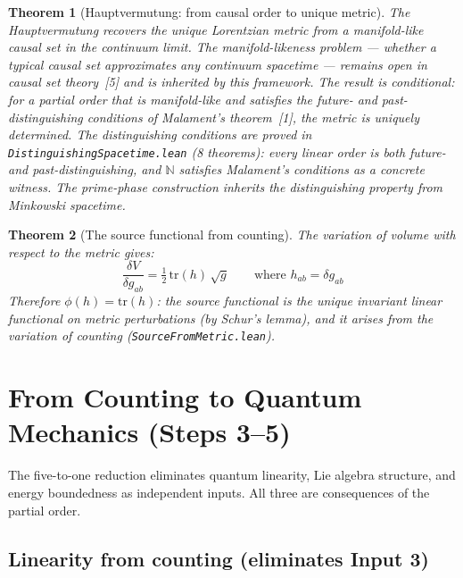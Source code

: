 \documentclass[11pt,letterpaper]{article}
\newtheorem{theorem}{Theorem}
\begin{document}
\begin{theorem}[Hauptvermutung: from causal order to unique metric]
The Hauptvermutung recovers the unique Lorentzian metric from a
manifold-like causal set in the continuum limit.  The
manifold-likeness problem --- whether a typical causal set
approximates any continuum spacetime --- remains open in causal set
theory~[5] and is inherited by this framework.  The result is
conditional: for a partial order that is manifold-like and satisfies
the future- and past-distinguishing conditions of Malament's
theorem~[1], the metric is uniquely determined.  The distinguishing
conditions are proved in \texttt{DistinguishingSpacetime.lean}
(8 theorems): every linear order is both future- and
past-distinguishing, and $\mathbb{N}$ satisfies Malament's
conditions as a concrete witness.  The prime-phase construction
inherits the distinguishing property from Minkowski spacetime.
\end{theorem}

\begin{theorem}[The source functional from counting]
\label{thm:source}
The variation of volume with respect to the metric gives:
\[
  \frac{\delta V}{\delta g_{ab}} = \tfrac{1}{2}\,\mathrm{tr}(h)
  \,\sqrt{g}
  \qquad \text{where } h_{ab} = \delta g_{ab}
\]
Therefore $\phi(h) = \mathrm{tr}(h)$: the source functional is the
unique invariant linear functional on metric perturbations (by
Schur's lemma), and it arises from the variation of counting
(\texttt{SourceFromMetric.lean}).
\end{theorem}

\section{From Counting to Quantum Mechanics (Steps 3--5)}
\label{sec:quantum}

The five-to-one reduction eliminates quantum linearity, Lie algebra
structure, and energy boundedness as independent inputs.  All three
are consequences of the partial order.

\subsection{Linearity from counting (eliminates Input 3)}
\end{document}
